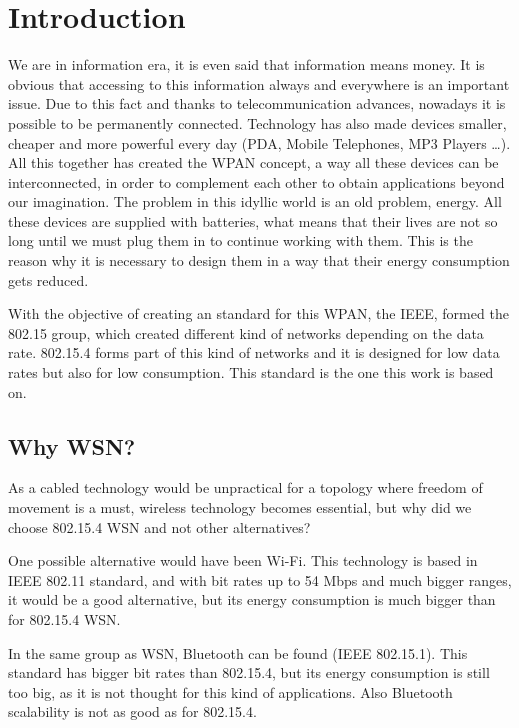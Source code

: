 \chapter{Introduction}
\label{chap:introduction}

We are in information era, it is even said that information means money. It is obvious that accessing to this information
always and everywhere is an important issue. Due to this fact and thanks to telecommunication advances, nowadays it is
possible to be permanently connected. Technology has also made devices smaller, cheaper and more powerful
every day (\ac{PDA}, Mobile Telephones, \ac{MP3} Players \ldots). All this together has created the \ac{WPAN} concept, a way 
all these devices can be interconnected, in order to complement each other to obtain applications beyond our imagination. The 
problem in this idyllic world is an old problem, energy. All these devices are supplied with batteries, what means that their 
lives are not so long until we must plug them in to continue working with them. This is the reason why it is necessary to design them
in a way that their energy consumption gets reduced.

With the objective of creating an standard for this \ac{WPAN}, the \ac{IEEE}, formed the 802.15 group, which created different 
kind of networks depending on the data rate. 802.15.4 forms part of this kind of networks and it is designed for low data rates but 
also for low consumption. This standard is the one this work is based on.

\section{Why \ac{WSN}?}

As a cabled technology would be unpractical for a topology where freedom of movement is a must, wireless technology becomes essential, 
but why did we choose 802.15.4 \ac{WSN} and not other alternatives?

One possible alternative would have been Wi-Fi. This technology is based in \ac{IEEE} 802.11 standard, and with bit rates up to
54 Mbps and much bigger ranges, it would be a good alternative, but its energy consumption is much bigger than for 802.15.4 \ac{WSN}.

In the same group as \ac{WSN}, Bluetooth can be found (\ac{IEEE} 802.15.1). This standard has bigger bit rates than 
802.15.4, but its energy consumption is still too big, as it is not thought for this kind of applications. Also Bluetooth scalability
is not as good as for 802.15.4.

